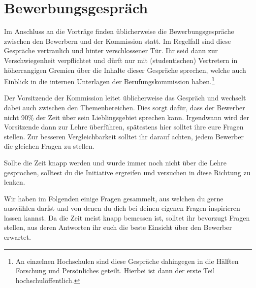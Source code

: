 \section{Bewerbungsgespräch}
Im Anschluss an die Vorträge finden üblicherweise die Bewerbungsgespräche zwischen den Bewerbern und der Kommission statt.
Im Regelfall sind diese Gespräche vertraulich und hinter verschlossener Tür.
Ihr seid dann zur Verschwiegenheit verpflichtet und dürft nur mit (studentischen) Vertretern in höherrangigen Gremien über die Inhalte dieser Gespräche sprechen, welche auch Einblick in die internen Unterlagen der Berufungskommission haben.\footnote{%
    An einzelnen Hochschulen sind diese Gespräche dahingegen in die Hälften Forschung und Persönliches geteilt.
    Hierbei ist dann der erste Teil hochschulöffentlich.}

Der Vorsitzende der Kommission leitet üblicherweise das Gespräch und wechselt dabei auch zwischen den Themenbereichen.
Dies sorgt dafür, dass der Bewerber nicht 90\% der Zeit über sein Lieblingsgebiet sprechen kann.
Irgendwann wird der Vorsitzende dann zur Lehre überführen, spätestens hier solltet ihre eure Fragen stellen.
Zur besseren Vergleichbarkeit solltet ihr darauf achten, jedem Bewerber die gleichen Fragen zu stellen.

Sollte die Zeit knapp werden und wurde immer noch nicht über die Lehre gesprochen, solltest du die Initiative ergreifen und versuchen in diese Richtung zu lenken.

Wir haben im Folgenden einige Fragen gesammelt, aus welchen du gerne auswählen darfst und von denen du dich bei deinen eigenen Fragen inspirieren lassen kannst.
Da die Zeit meist knapp bemessen ist, solltet ihr bevorzugt Fragen stellen, aus deren Antworten ihr euch die beste Einsicht über den Bewerber erwartet.

